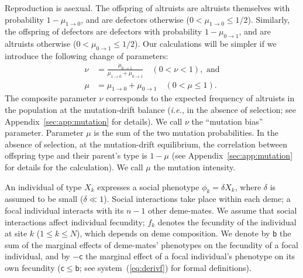 \documentclass[11pt, letterpaper]{article}
\newcommand{\sysref}[1]{system~(\ref{#1})}
\newcommand{\ie}{\textit{i.e.}}
\newcommand{\bigO}[1]{O\left( #1 \right)}
\newcommand{\appname}[0]{Appendix}
\newcommand{\bb}{\mathsf{b}}
\newcommand{\cc}{\mathsf{c}}
\newcommand{\mutbias}{\nu}
\newcommand{\selstr}{\delta}
\begin{document}
Reproduction is asexual. The offspring of altruists are altruists themselves with probability $1-\mu_{1\to 0}$, and are defectors otherwise ($0<\mu_{1\to 0}\leq 1/2$). Similarly, the offspring of defectors are defectors with probability $1-\mu_{0\to 1}$, and are altruists otherwise ($0<\mu_{0\to 1}\leq 1/2$). Our calculations will be simpler if we introduce the following change of parameters:
%
\begin{subequations}\label{eq:changemut}
\begin{align}
\mutbias & = \frac{\mu_{0\to 1}}{\mu_{1\to 0} + \mu_{0\to 1}} \quad (0<\mutbias<1), \textrm{ and}\label{eq:nu}\\
\mu &= \mu_{1\to 0} + \mu_{0\to 1} \quad (0 < \mu \leq 1)\label{eq:mu}.
\end{align}
\end{subequations}
The composite parameter $\mutbias$ corresponds to the expected frequency of altruists in the population at the mutation-drift balance (\ie, in the absence of selection; see \appname~\ref{sec:app:mutation} for details). We call $\mutbias$ the ``mutation bias'' parameter. Parameter $\mu$ is the sum of the two mutation probabilities. In the absence of selection, at the mutation-drift equilibrium, the correlation between offspring type and their parent's type is $1-\mu$ (see \appname~\ref{sec:app:mutation} for details for the calculation). We call $\mu$ the mutation intensity.%

An individual of type $X_k$ expresses a social phenotype $\phi_k = \selstr X_k$, where $\selstr$ is assumed to be small ($\selstr \ll 1$). Social interactions take place within each deme; a focal individual interacts with its $n-1$ other deme-mates. We assume that social interactions affect individual fecundity; $f_k$ denotes the fecundity of the individual at site $k$ ($1\leq k \leq N$), which depends on deme composition. We denote by $\bb$ the sum of the marginal effects of deme-mates' phenotypes on the fecundity of a focal individual, and by $-\cc$ the marginal effect of a focal individual's phenotype on its own fecundity ($\cc \leq \bb$; see \sysref{eq:derivf} for formal definitions). %
\end{document}
